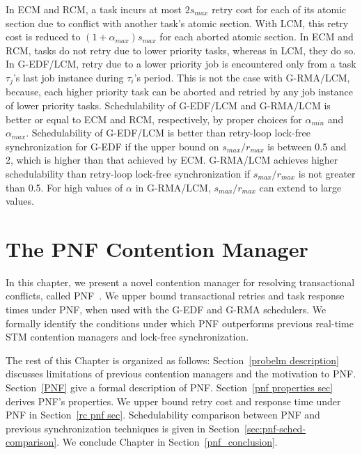 \documentclass[12pt,english]{report}
\begin{document}
In ECM and RCM, a task incurs at most $2s_{max}$ retry cost for each of its atomic section due to conflict
with another task's atomic section. With LCM, this retry cost is reduced to $(1+\alpha_{max})s_{max}$ for each aborted atomic section. In ECM and RCM, tasks do not retry due to lower priority tasks, whereas in LCM, they do so. In G-EDF/LCM, retry due to a lower priority job is encountered only from a task $\tau_{j}$'s last job instance 
during $\tau_{i}$'s period. This is not the case with G-RMA/LCM, because,  each higher priority task can be aborted and retried by any job instance of lower priority tasks. Schedulability of G-EDF/LCM and G-RMA/LCM is better or equal to ECM and RCM, respectively, by proper choices for $\alpha_{min}$ and $\alpha_{max}$. Schedulability of G-EDF/LCM is better than retry-loop lock-free synchronization for G-EDF if the upper bound on $s_{max}/r_{max}$ is between 0.5 and 2, which is higher than that achieved by ECM. 
G-RMA/LCM achieves higher schedulability than retry-loop lock-free synchronization if $s_{max}/r_{max}$ is not greater than 0.5. For high values of $\alpha$ in G-RMA/LCM, $s_{max}/r_{max}$ can extend to large values.


\chapter{\label{ch_pnf}The PNF Contention Manager}


In this chapter, we present a novel contention manager for resolving transactional conflicts, called PNF~\cite{pnf_emsoft12}. We upper bound transactional retries and task response times under PNF, when used with the G-EDF and  G-RMA schedulers. We formally identify the conditions under which PNF outperforms previous real-time STM contention managers and lock-free synchronization.

The rest of this Chapter is organized as follows: Section~\ref{probelm description} discusses limitations of previous contention managers and the motivation to PNF. Section~\ref{PNF} give a formal description of PNF. Section~\ref{pnf properties sec} derives PNF's properties. We upper bound retry cost and response time under PNF in Section~\ref{rc pnf sec}. Schedulability comparison between PNF and previous synchronization techniques is given in Section~\ref{sec:pnf-sched-comparison}. We conclude Chapter in Section~\ref{pnf_conclusion}.
\end{document}
